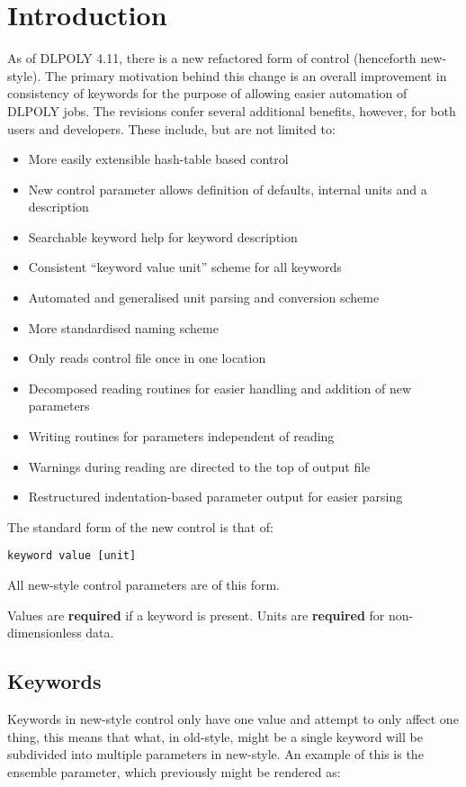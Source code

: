 \section{Introduction}
As of DLPOLY 4.11, there is a new refactored form of control (henceforth new-style). The primary motivation behind this change is an overall improvement in consistency of keywords for the purpose of allowing easier automation of DLPOLY jobs. The revisions confer several additional benefits, however, for both users and developers. These include, but are not limited to:

\begin{itemize}
  \item{}More easily extensible hash-table based control
  \item{}New control parameter allows definition of defaults, internal units and a description
  \item{}Searchable keyword help for keyword description
  \item{}Consistent ``keyword value unit'' scheme for all keywords
  \item{}Automated and generalised unit parsing and conversion scheme
  \item{}More standardised naming scheme
  \item{}Only reads control file once in one location
  \item{}Decomposed reading routines for easier handling and addition of new parameters
  \item{}Writing routines for parameters independent of reading
  \item{}Warnings during reading are directed to the top of output file
  \item{}Restructured indentation-based parameter output for easier parsing
\end{itemize}

The standard form of the new control is that of:
\begin{verbatim}
keyword value [unit]
\end{verbatim}
All new-style control parameters are of this form.

Values are \textbf{required} if a keyword is present.
Units are \textbf{required} for non-dimensionless data.

\subsection{Keywords}
Keywords in new-style control only have one value and attempt to only affect one thing, this means that what, in old-style, might be a single keyword will be subdivided into multiple parameters in new-style. An example of this is the ensemble parameter, which previously might be rendered as:

